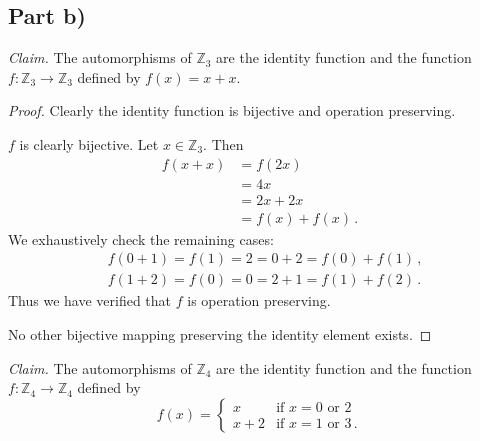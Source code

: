 \documentclass{abrice}
\newcommand{\Z}{\mathbb{Z}}
\newcommand{\Claim}{\noindent\emph{Claim.}\xspace}%
\begin{document}
\subsection{Part b)}

\Claim The automorphisms of $\Z_3$ are the identity function and the function $f : \Z_3
\to \Z_3$ defined by $f(x) = x + x$.

\begin{proof}
  Clearly the identity function is bijective and operation preserving.

  $f$ is clearly bijective. Let $x \in \Z_3$. Then
  \begin{align*}
    f(x + x)
    &= f(2x) \\
    &= 4x \\
    &= 2x + 2x \\
    &= f(x) + f(x)\, .
  \end{align*}
  We exhaustively check the remaining cases:
  \begin{align*}
    &f(0 + 1) = f(1) = 2 = 0 + 2 = f(0) + f(1)\, , \\
    & f(1 + 2) = f(0) = 0 = 2 + 1 = f(1) + f(2)\, .
  \end{align*}
  Thus we have verified that $f$ is operation preserving.

  No other bijective mapping preserving the identity element exists.
\end{proof}

\noindent
\Claim The automorphisms of $\Z_4$ are the identity function and the function $f
: \Z_4 \to \Z_4$ defined by
\[
  f(x) =
  \begin{cases}
    x &\text{if } x = 0 \text{ or } 2\\
    x + 2 &\text{if } x = 1 \text{ or } 3\, .
  \end{cases}
\]
\end{document}
